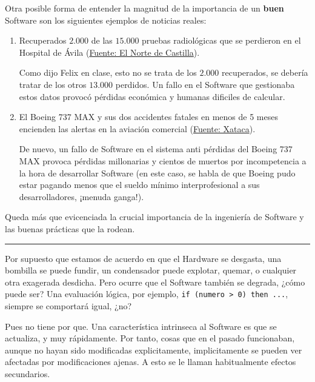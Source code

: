 Otra posible forma de entender la magnitud de la importancia de un \textbf{buen} Software son los siguientes 
ejemplos de noticias reales:

\begin{enumerate}
    \item Recuperados $2.000$ de las $15.000$ pruebas radiológicas que se perdieron en el Hospital de Ávila
    (\href{https://www.elnortedecastilla.es/avila/201602/01/recuperados-pruebas-radiologicas-perdieron-20160201193859.html}{Fuente: El Norte de Castilla}).

    Como dijo Felix en clase, esto no se trata de los $2.000$ recuperados, se debería tratar de los otros $13.000$
    perdidos. Un fallo en el Software que gestionaba estos datos provocó pérdidas económica y humanas dificiles de 
    calcular.

    \item El Boeing 737 MAX y sus dos accidentes fatales en menos de 5 meses encienden las alertas en la aviación 
    comercial (\href{https://www.xataka.com/vehiculos/avion-boeing-737-max-sus-dos-accidentes-fatales-cinco-meses-encienden-alertas-aviacion-comercial}{Fuente: Xataca}).

    De nuevo, un fallo de Software en el sistema anti pérdidas del Boeing 737 MAX provoca pérdidas millonarias y 
    cientos de muertos por incompetencia a la hora de desarrollar Software (en este caso, se habla de que Boeing
    pudo estar pagando menos que el sueldo mínimo interprofesional a sus desarrolladores, ¡menuda ganga!). 
\end{enumerate}

\noindent Queda más que evicenciada la crucial importancia de la ingeniería de Software y las buenas prácticas que
la rodean.

\noindent\rule{\textwidth}{0.4pt}

Por supuesto que estamos de acuerdo en que el Hardware se desgasta, una bombilla se puede fundir, un condensador puede
explotar, quemar, o cualquier otra exagerada desdicha. Pero ocurre que el Software también se degrada, ¿cómo puede
ser? Una evaluación lógica, por ejemplo, \lstinline{if (numero > 0) then ...}, siempre se comportará igual, ¿no? %

\vspace*{2mm}

Pues no tiene por que. Una característica intrinseca al Software es que se actualiza, y muy rápidamente. Por tanto,
cosas que en el pasado funcionaban, aunque no hayan sido modificadas explicitamente, implicitamente se pueden ver
afectadas por modificaciones ajenas. A esto se le llaman habitualmente efectos secundarios.

